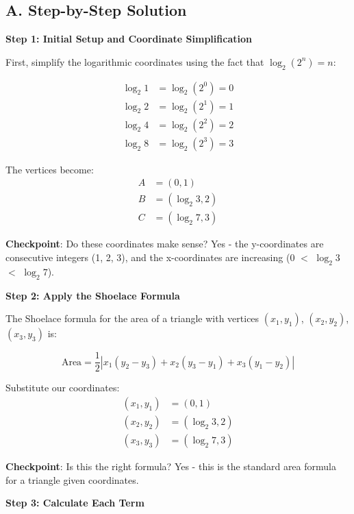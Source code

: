 \documentclass[12pt]{article}
\begin{document}
\begin{solutionbox}
\subsection*{A. Step-by-Step Solution}

\textbf{Step 1: Initial Setup and Coordinate Simplification}

First, simplify the logarithmic coordinates using the fact that $\log_2(2^n) = n$:

\begin{align*}
    \log_2 1 &= \log_2(2^0) = 0 \\
    \log_2 2 &= \log_2(2^1) = 1 \\
    \log_2 4 &= \log_2(2^2) = 2 \\
    \log_2 8 &= \log_2(2^3) = 3
\end{align*}

The vertices become:
\begin{align*}
    A &= (0, 1) \\
    B &= (\log_2 3, 2) \\
    C &= (\log_2 7, 3)
\end{align*}

\textbf{Checkpoint}: Do these coordinates make sense? Yes - the y-coordinates are consecutive integers (1, 2, 3), and the x-coordinates are increasing (0 $<$ $\log_2 3$ $<$ $\log_2 7$).

\vspace{0.3cm}

\textbf{Step 2: Apply the Shoelace Formula}

The Shoelace formula for the area of a triangle with vertices $(x_1, y_1)$, $(x_2, y_2)$, $(x_3, y_3)$ is:

$$\text{Area} = \frac{1}{2}|x_1(y_2 - y_3) + x_2(y_3 - y_1) + x_3(y_1 - y_2)|$$

Substitute our coordinates:
\begin{align*}
    (x_1, y_1) &= (0, 1) \\
    (x_2, y_2) &= (\log_2 3, 2) \\
    (x_3, y_3) &= (\log_2 7, 3)
\end{align*}

\textbf{Checkpoint}: Is this the right formula? Yes - this is the standard area formula for a triangle given coordinates.

\vspace{0.3cm}

\textbf{Step 3: Calculate Each Term}


\end{solutionbox}
\end{document}

